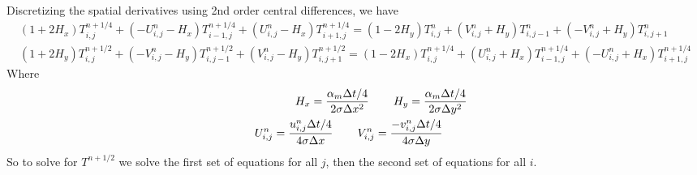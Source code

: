 \documentclass{article}
\begin{document}
Discretizing the spatial derivatives using 2nd order central differences, we have
\begin{eqnarray}
(1+2 H_x) T^{n+1/4}_{i,j}  + (-U^n_{i,j} - H_x) T^{n+1/4}_{i-1, j} + (U^n_{i,j} - H_x) T^{n+1/4}_{i+1, j} = 
(1-2 H_y) T^n_{i,j} + (V^n_{i,j} + H_y) T^n_{i, j-1} + (-V^n_{i,j} + H_y) T^n_{i, j+1} \\
(1+2 H_y) T^{n+1/2}_{i,j}  + (-V^n_{i,j} - H_y) T^{n+1/2}_{i, j-1} + (V^n_{i,j} - H_y) T^{n+1/2}_{i, j+1} = 
(1-2 H_x) T^{n+1/4}_{i,j} + (U^n_{i,j} + H_x) T^{n+1/4}_{i-1, j} + (-U^n_{i,j} + H_x) T^{n+1/4}_{i+1, j}
\end{eqnarray}
Where
\begin{eqnarray}
&&H_x = \frac{\alpha_m \Delta t/4}{2 \sigma \Delta x^2} \hspace{5ex} H_y = \frac{\alpha_m \Delta t/4}{2 \sigma \Delta y^2}  \\
&&U^n_{i,j} = \frac{u^n_{i,j} \Delta t/4}{4 \sigma \Delta x} \hspace{5ex} V^n_{i,j} = \frac{-v^n_{i,j} \Delta t/4}{4 \sigma \Delta y} \hspace{5ex} 
\end{eqnarray}
So to solve for $ T^{n+1/2} $ we solve the first set of equations for all $j$, then the second set of equations for all $i$.
\end{document}

